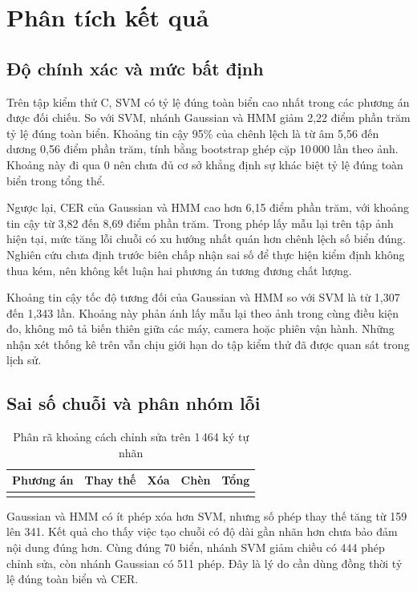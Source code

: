\chapter{Phân tích kết quả}
\section{Độ chính xác và mức bất định}
Trên tập kiểm thử C, SVM có tỷ lệ đúng toàn biển cao nhất trong các phương án được đối chiếu. So với SVM, nhánh Gaussian và HMM giảm 2,22 điểm phần trăm tỷ lệ đúng toàn biển. Khoảng tin cậy 95\% của chênh lệch là từ âm 5,56 đến dương 0,56 điểm phần trăm, tính bằng bootstrap ghép cặp 10\,000 lần theo ảnh. Khoảng này đi qua 0 nên chưa đủ cơ sở khẳng định sự khác biệt tỷ lệ đúng toàn biển trong tổng thể.

Ngược lại, CER của Gaussian và HMM cao hơn 6,15 điểm phần trăm, với khoảng tin cậy từ 3,82 đến 8,69 điểm phần trăm. Trong phép lấy mẫu lại trên tập ảnh hiện tại, mức tăng lỗi chuỗi có xu hướng nhất quán hơn chênh lệch số biển đúng. Nghiên cứu chưa định trước biên chấp nhận sai số để thực hiện kiểm định không thua kém, nên không kết luận hai phương án tương đương chất lượng.

Khoảng tin cậy tốc độ tương đối của Gaussian và HMM so với SVM là từ 1,307 đến 1,343 lần. Khoảng này phản ánh lấy mẫu lại theo ảnh trong cùng điều kiện đo, không mô tả biến thiên giữa các máy, camera hoặc phiên vận hành. Những nhận xét thống kê trên vẫn chịu giới hạn do tập kiểm thử đã được quan sát trong lịch sử.

\section{Sai số chuỗi và phân nhóm lỗi}
\begin{table}[H]\centering
\caption{Phân rã khoảng cách chỉnh sửa trên 1\,464 ký tự nhãn}
\begin{tabularx}{\textwidth}{Y r r r r}
\toprule
Phương án & Thay thế & Xóa & Chèn & Tổng\\
\midrule
{}
\bottomrule
\end{tabularx}
\end{table}

Gaussian và HMM có ít phép xóa hơn SVM, nhưng số phép thay thế tăng từ 159 lên 341. Kết quả cho thấy việc tạo chuỗi có độ dài gần nhãn hơn chưa bảo đảm nội dung đúng hơn. Cùng đúng 70 biển, nhánh SVM giảm chiều có 444 phép chỉnh sửa, còn nhánh Gaussian có 511 phép. Đây là lý do cần dùng đồng thời tỷ lệ đúng toàn biển và CER.


